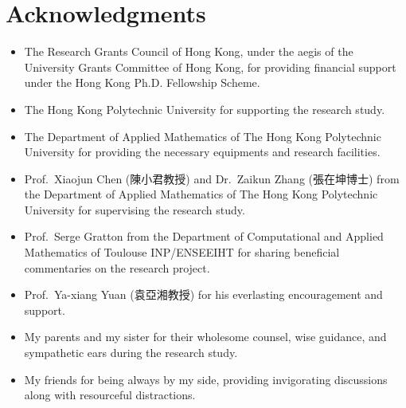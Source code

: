 %
%
%
\chapter*{Acknowledgments}
\label{ch:acknowledgments}

\begin{itemize}
    \item The Research Grants Council of Hong Kong, under the aegis of the University Grants Committee of Hong Kong, for providing financial support under the Hong Kong Ph.D. Fellowship Scheme.
    \item The Hong Kong Polytechnic University for supporting the research study.
    \item The Department of Applied Mathematics of The Hong Kong Polytechnic University for providing the necessary equipments and research facilities.
    \item Prof.\ Xiaojun Chen (陳小君教授) and Dr.\ Zaikun Zhang (張在坤博士) from the Department of Applied Mathematics of The Hong Kong Polytechnic University for supervising the research study.
    \item Prof.\ Serge Gratton from the Department of Computational and Applied Mathematics of Toulouse INP/ENSEEIHT for sharing beneficial commentaries on the research project.
    \item Prof.\ Ya-xiang Yuan (袁亞湘教授) for his everlasting encouragement and support.
    \item My parents and my sister for their wholesome counsel, wise guidance, and sympathetic ears during the research study.
    \item My friends for being always by my side, providing invigorating discussions along with resourceful distractions.
\end{itemize}
